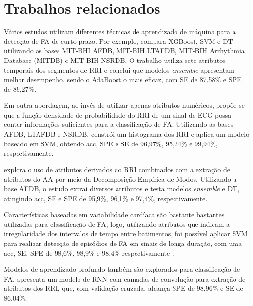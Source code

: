 \section{Trabalhos relacionados}
\label{sec:artigo}

Vários estudos utilizam diferentes técnicas de aprendizado de máquina para a detecção de \gls{FA} de curto prazo. Por exemplo, \cite{jahanShorttermAtrialFibrillation2022} compara \gls{XGBoost}, \gls{SVM} e \gls{DT} utilizando as bases MIT-BHI \gls{AFDB}, MIT-BIH \gls{LTAFDB}, MIT-BIH Arrhythmia Database (MITDB) e MIT-BIH \gls{NSRDB}. O trabalho utiliza sete atributos temporais dos segmentos de \gls{RRI} e conclui que modelos \textit{ensemble} apresentam melhor desempenho, sendo o AdaBoost o mais eficaz, com \gls{SE} de 87,58\% e \gls{SPE} de 89,27\%.

Em outra abordagem, ao invés de utilizar apenas atributos numéricos, propõe-se que a função densidade de probabilidade do \gls{RRI} de um sinal de \gls{ECG} possa conter informações suficientes para a classificação de \gls{FA}. Utilizando as bases \gls{AFDB}, \gls{LTAFDB} e \gls{NSRDB}, \cite{duanAccurateDetectionAtrial2022} constrói um histograma dos \gls{RRI} e aplica um modelo baseado em \gls{SVM}, obtendo \gls{acc}, \gls{SPE} e \gls{SE} de 96,97\%, 95,24\% e 99,94\%, respectivamente.

\cite{hirschAtrialFibrillationDetection2021} explora o uso de atributos derivados do \gls{RRI} combinados com a extração de atributos do \gls{AA} por meio da Decomposição Empírica de Modos. Utilizando a base \gls{AFDB}, o estudo extrai diversos atributos e testa modelos \textit{ensemble} e \gls{DT}, atingindo \gls{acc}, \gls{SE} e \gls{SPE} de 95,9\%, 96,1\% e 97,4\%, respectivamente.

Características baseadas em variabilidade cardíaca são bastante bastantes utilizadas para classificação de \gls{FA}, logo, utilizando atributos que indicam a irregularidade dos intervalos de tempo entre batimentos, foi possível aplicar \gls{SVM} para realizar detecção de episódios de \gls{FA} em sinais de longa duração, com uma \gls{acc}, \gls{SE}, \gls{SPE} de 98,6\%, 98,9\% e 98,4\% respectivamente \cite{czabanskiDetectionAtrialFibrillation2020}.

Modelos de aprendizado profundo também são explorados para classificação de \gls{FA}. \cite{andersenDeepLearningApproach2019} apresenta um modelo de \gls{RNN} com camadas de convolução para extração de atributos dos \gls{RRI}, que, com validação cruzada, alcança \gls{SPE} de 98,96\% e \gls{SE} de 86,04\%.


